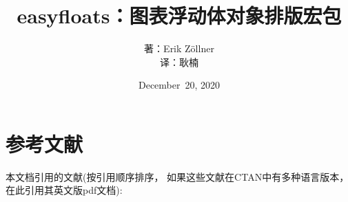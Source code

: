\documentclass[a4paper]{ltxdoc}
\title{easyfloats：图表浮动体对象排版宏包}
\author{著：Erik Zöllner\\译：耿楠}
\date{December~20, 2020}
\newcommand{\myinput}[1]{\unskip}
\begin{document}
	\myinput{undescribed-keywords}
	\myinput{content/titlepage}
	\myinput{content/examples}
	\myinput{content/names}
	\myinput{content/documentation}
	\myinput{content/installation}
	\myinput{content/bug-reports-and-contributions}
	\myinput{content/license}

	\appendix	
	\myinput{content/motivation}
	\myinput{content/used-packages}
	\myinput{content/other-packages}

	\section{参考文献}
	本文档引用的文献(按引用顺序排序，
	如果这些文献在CTAN中有多种语言版本，在此引用其英文版pdf文档):
	\printbibliography[heading=none]

\end{document}

